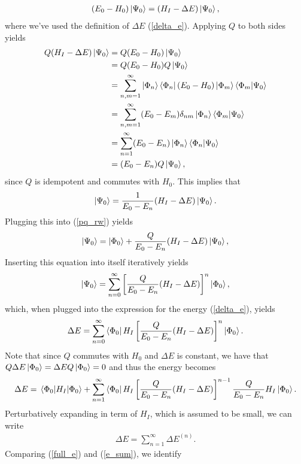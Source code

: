 \documentclass[10pt]{article}
\begin{document}
\begin{align}
(E_0-H_0)\ket{\Psi_0}=(H_I-\Delta E)\ket{\Psi_0},
\end{align}
where we've used the definition of $\Delta E$ (\ref{delta_e}). Applying $Q$ to both sides yields
\begin{align}
Q(H_I-\Delta E)\ket{\Psi_0}
&=
Q(E_0-H_0)\ket{\Psi_0}
\\
&=
Q(E_0-H_0)Q\ket{\Psi_0}
\\
&=
\sum_{n,m=1}^\infty\ket{\Phi_n}\bra{\Phi_n}(E_0-H_0)\ket{\Phi_m}\bra{\Phi_m}\ket{\Psi_0}
\\
&=
\sum_{n,m=1}^\infty(E_0-E_m)\delta_{nm}\ket{\Phi_n}\bra{\Phi_m}\ket{\Psi_0}
\\
&=
\sum_{n=1}^\infty(E_0-E_n)\ket{\Phi_n}\bra{\Phi_n}\ket{\Psi_0}
\\
&=
(E_0-E_n)Q\ket{\Psi_0},
\end{align}
since $Q$ is idempotent and commutes with $H_0$. This implies that
\begin{align}
\ket{\Psi_0}=\frac{1}{E_0-E_n}(H_I-\Delta E)\ket{\Psi_0}.
\end{align}
Plugging this into (\ref{pq_rw}) yields
\begin{align}
\ket{\Psi_0}=\ket{\Phi_0} + \frac{Q}{E_0-E_n}(H_I-\Delta E)\ket{\Psi_0}, 
\end{align}
Inserting this equation into itself iteratively yields
\begin{align}
\ket{\Psi_0}
=
\sum_{n=0}^\infty\left[\frac{Q}{E_0-E_n}(H_I-\Delta E)\right]^n\ket{\Phi_0},
\end{align}
which, when plugged into the expression for the energy (\ref{delta_e}), yields
\begin{align}
\Delta E
=
\sum_{n=0}^\infty\bra{\Phi_0}H_I\left[\frac{Q}{E_0-E_n}(H_I-\Delta E)\right]^n\ket{\Phi_0}.
\end{align}
Note that since $Q$ commutes with $H_0$ and $\Delta E$ is constant, we have that $Q\Delta E\ket{\Phi_0}=\Delta EQ\ket{\Phi_0}=0$ and thus the energy becomes
\begin{align}
\label{full_e}
\Delta E
=
\mel{\Phi_0}{H_I}{\Phi_0}+
\sum_{n=1}^\infty\bra{\Phi_0}H_I\left[\frac{Q}{E_0-E_n}(H_I-\Delta E)\right]^{n-1}\frac{Q}{E_0-E_n}H_I\ket{\Phi_0}.
\end{align}
Perturbatively expanding in term of $H_I$, which is assumed to be small, we can write
\begin{align}
\label{e_sum}
\Delta E=\sum_{n=1}^\infty \Delta E^{(n)}.
\end{align}
Comparing (\ref{full_e}) and (\ref{e_sum}), we identify
\end{document}
